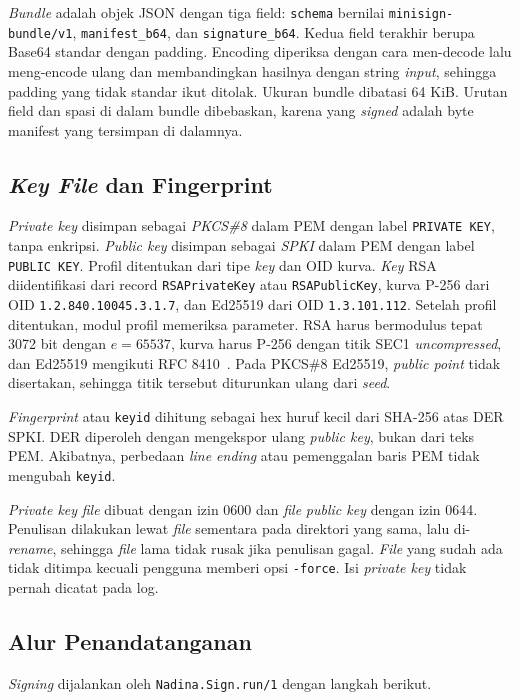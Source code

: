 \textit{Bundle} adalah objek JSON dengan tiga field: \texttt{schema} bernilai
\texttt{minisign-bundle/v1}, \texttt{manifest\_b64}, dan \texttt{signature\_b64}. Kedua field
terakhir berupa Base64 standar dengan padding. Encoding diperiksa dengan cara men-decode lalu
meng-encode ulang dan membandingkan hasilnya dengan string \textit{input}, sehingga padding yang tidak
standar ikut ditolak. Ukuran bundle dibatasi 64 KiB. Urutan field dan spasi di dalam bundle
dibebaskan, karena yang \textit{signed} adalah byte manifest yang tersimpan di dalamnya.

\subsection{\textit{Key File} dan Fingerprint}
\textit{Private key} disimpan sebagai \textit{PKCS\#8} dalam PEM dengan label \texttt{PRIVATE KEY}, tanpa
enkripsi. \textit{Public key} disimpan sebagai \textit{SPKI} dalam PEM dengan label \texttt{PUBLIC KEY}.
Profil ditentukan dari tipe \textit{key} dan OID kurva. \textit{Key} RSA diidentifikasi dari record
\texttt{RSAPrivateKey} atau \texttt{RSAPublicKey}, kurva P-256 dari OID \texttt{1.2.840.10045.3.1.7},
dan Ed25519 dari OID \texttt{1.3.101.112}. Setelah profil ditentukan, modul profil memeriksa
parameter. RSA harus bermodulus tepat 3072 bit dengan $e = 65537$, kurva harus P-256 dengan titik
SEC1 \textit{uncompressed}, dan Ed25519 mengikuti RFC 8410~\cite{rfc8410}. Pada PKCS\#8 Ed25519, \textit{public point}
tidak disertakan, sehingga titik tersebut diturunkan ulang dari \textit{seed}.

\textit{Fingerprint} atau \texttt{keyid} dihitung sebagai hex huruf kecil dari SHA-256 atas DER
SPKI. DER diperoleh dengan mengekspor ulang \textit{public key}, bukan dari teks PEM. Akibatnya,
perbedaan \textit{line ending} atau pemenggalan baris PEM tidak mengubah \texttt{keyid}.

\textit{Private key} \textit{file} dibuat dengan izin 0600 dan \textit{file} \textit{public key} dengan izin 0644. Penulisan
dilakukan lewat \textit{file} sementara pada direktori yang sama, lalu di-\textit{rename}, sehingga
\textit{file} lama tidak rusak jika penulisan gagal. \textit{File} yang sudah ada tidak ditimpa kecuali
pengguna memberi opsi \texttt{-force}. Isi \textit{private key} tidak pernah dicatat pada log.

\subsection{Alur Penandatanganan}
\textit{Signing} dijalankan oleh \texttt{Nadina.Sign.run/1} dengan langkah berikut.

